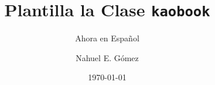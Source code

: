 \titlehead{Plantilla de \LaTeX} 	%
\subject{Para hacer lindos libros}	%

\title[Plantilla la Clase {\normalfont\texttt{kaobook}}]{Plantilla la Clase {\normalfont\texttt{kaobook}}}
\subtitle{Ahora en Español}
\author[JBG]{Nahuel E. Gómez}
\date{\today}
\publishers{Un Editor Impresionante}